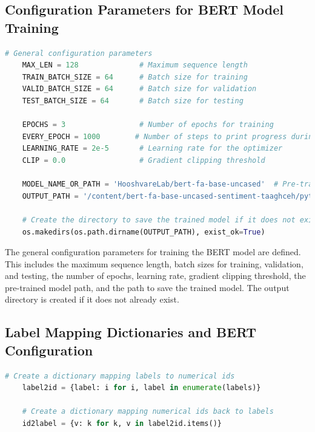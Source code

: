 \documentclass{solutionclass} %
\begin{document}
\begin{solution}
    \subsection*{Configuration Parameters for BERT Model Training}
    
    \begin{lstlisting}[language=Python, basicstyle=\ttfamily\footnotesize, keywordstyle=\color{blue}, commentstyle=\color{gray}]
    # General configuration parameters
    MAX_LEN = 128              # Maximum sequence length
    TRAIN_BATCH_SIZE = 64      # Batch size for training
    VALID_BATCH_SIZE = 64      # Batch size for validation
    TEST_BATCH_SIZE = 64       # Batch size for testing
    
    EPOCHS = 3                 # Number of epochs for training
    EVERY_EPOCH = 1000        # Number of steps to print progress during each epoch
    LEARNING_RATE = 2e-5       # Learning rate for the optimizer
    CLIP = 0.0                 # Gradient clipping threshold
    
    MODEL_NAME_OR_PATH = 'HooshvareLab/bert-fa-base-uncased'  # Pre-trained model name or path
    OUTPUT_PATH = '/content/bert-fa-base-uncased-sentiment-taaghceh/pytorch_model.bin'  # Path to save the trained model
    
    # Create the directory to save the trained model if it does not exist
    os.makedirs(os.path.dirname(OUTPUT_PATH), exist_ok=True)
    \end{lstlisting}
    
    The general configuration parameters for training the BERT model are defined. This includes the maximum sequence length, batch sizes for training, validation, and testing, the number of epochs, learning rate, gradient clipping threshold, the pre-trained model path, and the path to save the trained model. The output directory is created if it does not already exist.
    
    \subsection*{Label Mapping Dictionaries and BERT Configuration}
    
    \begin{lstlisting}[language=Python, basicstyle=\ttfamily\footnotesize, keywordstyle=\color{blue}, commentstyle=\color{gray}]
    # Create a dictionary mapping labels to numerical ids
    label2id = {label: i for i, label in enumerate(labels)}
    
    # Create a dictionary mapping numerical ids back to labels
    id2label = {v: k for k, v in label2id.items()}
    

\end{lstlisting}
\end{solution}
\end{document}
